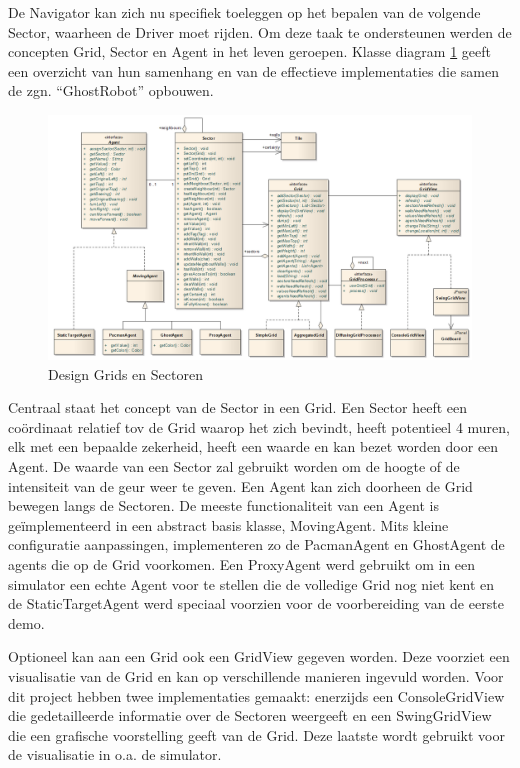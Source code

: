 \documentclass[12pt,a4paper]{report}
\begin{document}
De Navigator kan zich nu specifiek toeleggen op het bepalen van de volgende Sector, waarheen de Driver moet rijden. Om deze taak te ondersteunen werden de concepten Grid, Sector en Agent in het leven geroepen. Klasse diagram \ref{uml:grids-sectors} geeft een overzicht van hun samenhang en van de effectieve implementaties die samen de zgn. ``GhostRobot'' opbouwen.

\begin{figure}[htbp]
  \centering
  \includegraphics[width=200mm, angle=90]{resources/grids-sectors.png}
  \caption{Design Grids en Sectoren}
  \label{uml:grids-sectors}
\end{figure}

Centraal staat het concept van de Sector in een Grid. Een Sector heeft een co\"ordinaat relatief tov de Grid waarop het zich bevindt, heeft potentieel 4 muren, elk met een bepaalde zekerheid, heeft een waarde en kan bezet worden door een Agent. De waarde van een Sector zal gebruikt worden om de hoogte of de intensiteit van de geur weer te geven. Een Agent kan zich doorheen de Grid bewegen langs de Sectoren. De meeste functionaliteit van een Agent is ge\"implementeerd in een abstract basis klasse, MovingAgent. Mits kleine configuratie aanpassingen, implementeren zo de PacmanAgent en GhostAgent de agents die op de Grid voorkomen. Een ProxyAgent werd gebruikt om in een simulator een echte Agent voor te stellen die de volledige Grid nog niet kent en de StaticTargetAgent werd speciaal voorzien voor de voorbereiding van de eerste demo.

Optioneel kan aan een Grid ook een GridView gegeven worden. Deze voorziet een visualisatie van de Grid en kan op verschillende manieren ingevuld worden. Voor dit project hebben twee implementaties gemaakt: enerzijds een ConsoleGridView die gedetailleerde informatie over de Sectoren weergeeft en een SwingGridView die een grafische voorstelling geeft van de Grid. Deze laatste wordt gebruikt voor de visualisatie in o.a. de simulator.
\end{document}
